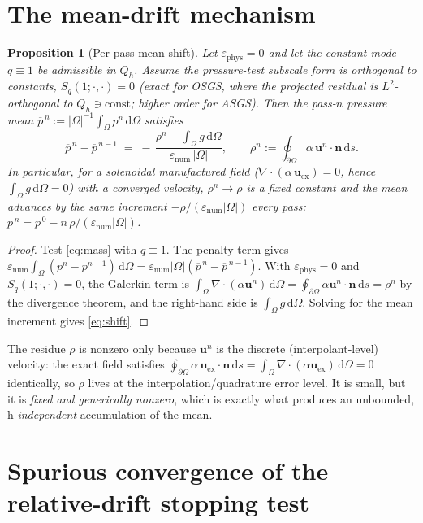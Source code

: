 \documentclass[11pt]{article}
\theoremstyle{plain}
\newtheorem{proposition}{Proposition}
\theoremstyle{remark}
\newcommand{\bu}{\boldsymbol{u}}
\newcommand{\bn}{\boldsymbol{n}}
\newcommand{\Om}{\Omega}
\newcommand{\dOm}{\partial\Omega}
\newcommand{\meas}{\lvert\Omega\rvert}
\newcommand{\enum}{\varepsilon_{\mathrm{num}}}
\newcommand{\ephys}{\varepsilon_{\mathrm{phys}}}
\newcommand{\pbar}{\overline{p}}
\newcommand{\dx}{\,\mathrm{d}\Omega}
\newcommand{\ds}{\,\mathrm{d}s}
\begin{document}
\section{The mean-drift mechanism}
\label{sec:drift}

\begin{proposition}[Per-pass mean shift]
\label{prop:drift}
Let $\ephys=0$ and let the constant mode $q\equiv1$ be admissible in $Q_h$. Assume the pressure-test
subscale form is orthogonal to constants, $S_q(1;\cdot,\cdot)=0$ \textup{(}exact for OSGS, where the
projected residual is $L^2$-orthogonal to $Q_h\ni\mathrm{const}$; higher order for
ASGS\textup{)}. Then the pass-$n$ pressure mean $\pbar^{\,n}:=\meas^{-1}\int_{\Om}p^{n}\dx$ satisfies
\begin{equation}
\label{eq:shift}
\pbar^{\,n}-\pbar^{\,n-1} \;=\; -\,\frac{\rho^{n}-\int_{\Om} g\dx}{\enum\,\meas},
\qquad
\rho^{n}:=\oint_{\dOm}\alpha\,\bu^{n}\cdot\bn\ds .
\end{equation}
In particular, for a solenoidal manufactured field \textup{(}$\nabla\!\cdot(\alpha\,\bu_{\mathrm{ex}})=0$,
hence $\int_\Om g\dx=0$\textup{)} with a converged velocity, $\rho^{n}\to\rho$ is a fixed constant and the
mean advances by the same increment $-\rho/(\enum\meas)$ \emph{every} pass:
$\pbar^{\,n}=\pbar^{\,0}-n\,\rho/(\enum\meas)$.
\end{proposition}

\begin{proof}
Test \eqref{eq:mass} with $q\equiv1$. The penalty term gives
$\enum\int_{\Om}(p^{n}-p^{n-1})\dx=\enum\meas(\pbar^{\,n}-\pbar^{\,n-1})$. With $\ephys=0$ and
$S_q(1;\cdot,\cdot)=0$, the Galerkin term is
$\int_{\Om}\nabla\!\cdot(\alpha\bu^{n})\dx=\oint_{\dOm}\alpha\bu^{n}\cdot\bn\ds=\rho^{n}$ by the
divergence theorem, and the right-hand side is $\int_\Om g\dx$. Solving for the mean increment gives
\eqref{eq:shift}.
\end{proof}

The residue $\rho$ is nonzero only because $\bu^{n}$ is the discrete (interpolant-level) velocity: the
exact field satisfies $\oint_{\dOm}\alpha\,\bu_{\mathrm{ex}}\cdot\bn\ds=\int_\Om\nabla\!\cdot(\alpha
\bu_{\mathrm{ex}})\dx=0$ identically, so $\rho$ lives at the interpolation/quadrature error level. It is
small, but it is \emph{fixed and generically nonzero}, which is exactly what produces an unbounded,
h-\emph{independent} accumulation of the mean.

\section{Spurious convergence of the relative-drift stopping test}
\label{sec:stop}
\end{document}

